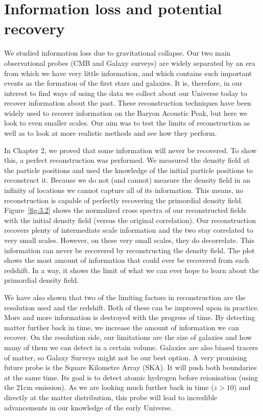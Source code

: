 
\section{Information loss and potential recovery}

We studied information loss due to gravitational collapse. Our two main observational probes (CMB and Galaxy surveys) are widely separated by an era from which we have very little information, and which contains such important events as the formation of the first stars and galaxies. It is, therefore, in our interest to find ways of using the data we collect about our Universe today to recover information about the past. These reconstruction techniques have been widely used to recover information on the Baryon Acoustic Peak, but here we look to even smaller scales. Our aim was to test the limits of reconstruction as well as to look at more realistic methods and see how they perform.

In Chapter 2, we proved that some information will never be recovered. To show this, a perfect reconstruction was performed. We measured the density field at the particle positions and used the knowledge of the initial particle positions to reconstruct it. Because we do not (and cannot) measure the density field in an infinity of locations we cannot capture all of its information. This means, no reconstruction is capable of perfectly recovering the primordial density field.
Figure~\ref{fig:3.2} shows the normalized cross spectra of our reconstructed fields with the initial density field (versus the original correlation). Our reconstruction recovers plenty of  intermediate scale information and the two stay correlated to very small scales. However, on these very small scales, they do decorrelate. This information can never be recovered by reconstructing the density field. The plot shows the most amount of information that could ever be recovered from each redshift. In a way, it shows the limit of what we can ever hope to learn about the primordial density field. 

We have also shown that two of the limiting factors in reconstruction are the resolution used and the redshift. Both of these can be improved upon in practice. More and more information is destroyed with the progress of time. By detecting matter further back in time, we increase the amount of information we can recover. On the resolution side, our limitations are the size of galaxies and how many of them we can detect in a certain volume. Galaxies are also biased tracers of matter, so Galaxy Surveys might not be our best option. A very promising future probe is the Square Kilometre Array (SKA). It will push both boundaries at the same time. Its goal is to detect atomic hydrogen before reionisation (using the 21cm emission). As we are looking much further back in time ($z>10$) and directly at the matter distribution, this probe will lead to incredible advancements in our knowledge of the early Universe.






